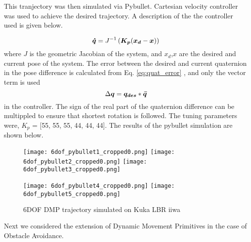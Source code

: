 

This tranjectory was then simulated via Pybullet. Cartesian velocity controller was used to achieve the desired trajectory.
A description of the the controller used is given below.

\begin{equation}
    \boldsymbol{\dot{q}} = J^{-1} \left( \boldsymbol{K_p} (\boldsymbol{x_d} - \boldsymbol{x}) \right)
\end{equation}
where $J$ is the geometric Jacobian of the system, and $x_d$,$x$ are the desired and current pose of the system. The error 
between the desired and current quaternion in the pose difference is calculated from Eq. \ref{eq:quat_error} , and only the vector term is used
\begin{equation}\label{quat_error}
    \Delta \boldsymbol{q} = \boldsymbol{q_{des}} * \boldsymbol{\bar{q}}
\end{equation}
in the controller. The sign of the real part of the quaternion difference can be multippled to ensure that shortest rotation is followed.
The tuning parameters were, $K_p$ = [55, 55, 55, 44, 44, 44].
The results of the pybullet simulation are shown below.

\begin{figure}[h]
    \centering
    \texttt{[image: 6dof\_pybullet1\_cropped0.png]}\quad
    \texttt{[image: 6dof\_pybullet2\_cropped0.png]}\quad
    \texttt{[image: 6dof\_pybullet3\_cropped0.png]}

    \medskip

    \texttt{[image: 6dof\_pybullet4\_cropped0.png]}\quad
    \texttt{[image: 6dof\_pybullet5\_cropped0.png]}

    \caption{6DOF DMP trajectory simulated on Kuka LBR iiwa }
    \label{fig:6DOF_traj_pybullet}
\end{figure}

Next we considered the extension of Dynamic Movement Primitives in the case of Obstacle Avoidance.






















